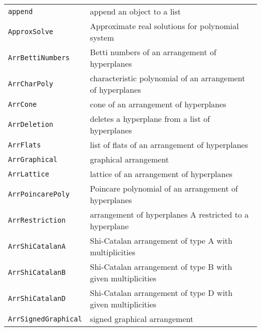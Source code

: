 \documentclass[a4paper]{mybook}
\begin{document}
        

\begin{center}
\begin{longtable}{ll}
   
{\verb~append~} &
      append an object to a list\\
   
{\verb~ApproxSolve~} &
      Approximate real solutions for polynomial system\\
   
{\verb~ArrBettiNumbers~} &
      Betti numbers of an arrangement of hyperplanes\\
   
{\verb~ArrCharPoly~} &
      characteristic polynomial of an arrangement of hyperplanes\\
   
{\verb~ArrCone~} &
      cone of an arrangement of hyperplanes\\
   
{\verb~ArrDeletion~} &
      deletes a hyperplane from a list of hyperplanes\\
   
{\verb~ArrFlats~} &
      list of flats of an arrangement of hyperplanes\\
   
{\verb~ArrGraphical~} &
      graphical arrangement\\
   
{\verb~ArrLattice~} &
      lattice of an arrangement of hyperplanes\\
   
{\verb~ArrPoincarePoly~} &
      Poincare polynomial of an arrangement of hyperplanes\\
   
{\verb~ArrRestriction~} &
      arrangement of hyperplanes A restricted to a hyperplane\\
   
{\verb~ArrShiCatalanA~} &
      Shi-Catalan arrangement of type A with multiplicities\\
   
{\verb~ArrShiCatalanB~} &
      Shi-Catalan arrangement of type B with given multiplicities\\
   
{\verb~ArrShiCatalanD~} &
      Shi-Catalan arrangement of type D with given multiplicities\\
   
{\verb~ArrSignedGraphical~} &
      signed graphical arrangement\\
   

\end{longtable}
\end{center}
\end{document}
